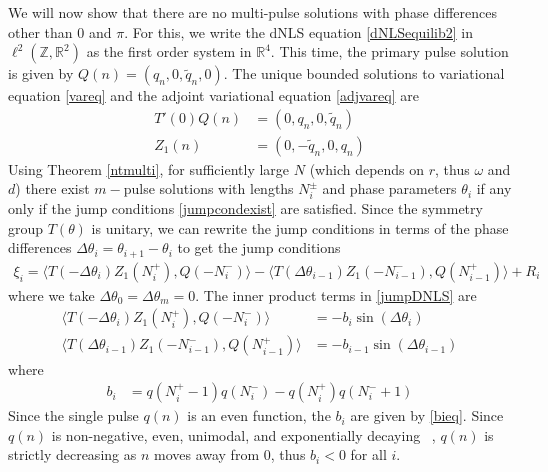 \documentclass[12pt]{article}
\def\R{{\mathbb R}}
\def\Z{{\mathbb Z}}
\begin{document}
We will now show that there are no multi-pulse solutions with phase differences other than $0$ and $\pi$. For this, we write the dNLS equation \eqref{dNLSequilib2} in $\ell^2(\Z, \R^2)$ as the first order system in $\R^4$. This time, the primary pulse solution is given by $Q(n) = (q_n, 0, \tilde{q}_n, 0)$. The unique bounded solutions to variational equation \eqref{vareq} and the adjoint variational equation \eqref{adjvareq} are
\begin{align*}
T'(0) Q(n) &= (0, q_n, 0, \tilde{q}_n) \\
Z_1(n) &= (0, -\tilde{q}_n, 0, q_n)
\end{align*}
Using Theorem \ref{ntmulti}, for sufficiently large $N$ (which depends on $r$, thus $\omega$ and $d$) there exist $m-$pulse solutions with lengths $N_i^\pm$ and phase parameters $\theta_i$ if any only if the jump conditions \eqref{jumpcondexist} are satisfied. Since the symmetry group $T(\theta)$ is unitary, we can rewrite the jump conditions in terms of the phase differences $\Delta \theta_i = \theta_{i+1} - \theta_i$ to get the jump conditions
\begin{align}\label{jumpDNLS}
\xi_i = \langle T(-\Delta \theta_i) Z_1(N_i^+), Q(-N_i^-) \rangle
- \langle T(\Delta \theta_{i-1}) Z_1(-N_{i-1}^-), Q(N_{i-1}^+) \rangle + R_i
\end{align}
where we take $\Delta \theta_0 = \Delta \theta_m = 0$. The inner product terms in \eqref{jumpDNLS} are
\begin{equation}\label{jumpIPs}
\begin{aligned}
\langle T(-\Delta\theta_i) Z_1(N_i^+), Q(-N_i^-) \rangle 
&= -b_i \sin(\Delta\theta_i) \\
\langle T(\Delta\theta_{i-1}) Z_1(-N_{i-1}^-), Q(N_{i-1}^+) \rangle &= -b_{i-1} \sin(\Delta\theta_{i-1})
\end{aligned}
\end{equation}
where 
\begin{align*}
b_i &= q(N_i^+ - 1)q(N_i^-) - q(N_i^+)q(N_i^- + 1)
\end{align*}
Since the single pulse $q(n)$ is an even function, the $b_i$ are given by \eqref{bieq}. Since $q(n)$ is non-negative, even, unimodal, and exponentially decaying ~\cite[Theorem 1]{herrmann_2011}, $q(n)$ is strictly decreasing as $n$ moves away from 0, thus $b_i < 0$ for all $i$. 
\end{document}
